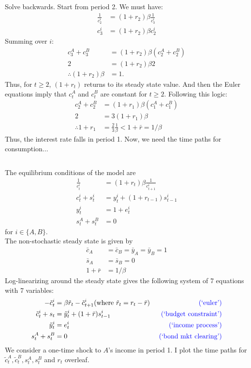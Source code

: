 \documentclass[12pt]{article}
\begin{document}
Solve backwards. Start from period 2. We must have:
\begin{align*}
\frac{1}{c^i_2} &= (1+r_2)\beta \frac{1}{c^i_{3}} \\
c^i_3 &= (1+r_2)\beta c^i_2
\end{align*}
Summing over $i$:
\begin{align*}
c^A_3 + c^B_3 &=(1+r_2)\beta (c^A_2+c^B_2)\\
2 &=(1+r_2)\beta 2\\
\therefore (1+r_2)\beta &= 1.
\end{align*}
Thus, for $t\geq 2$, $(1+r_t)$ returns to its steady state value. And then the Euler equations imply that $c^A_t$ and $c^B_t$ are constant for $t\geq 2$. Following this logic:
\begin{align*}
c^A_2 + c^B_2 &=(1+r_1)\beta (c^A_1+c^B_1)\\
2 &= 3(1+r_1)\beta\\
\therefore 1+r_1 &= \frac{2}{3} \frac{1}{\beta} < 1+ \bar r = 1/\beta
\end{align*}
Thus, the interest rate falls in period 1. Now, we need the time paths for consumption...



\subsection{}
The equilibrium conditions of the model are
\begin{align}
\frac{1}{c^i_t} &=(1+r_t)\beta \frac{1}{c^i_{t+1}}\\
c^i_t + s^i_t &= y^i_t + (1+r_{t-1})s^i_{t-1}\\
y_t^i &= 1 + e^i_t \\
s^A_t + s^B_t &=0
\end{align}
for $i \in \{A,B\}$.\\

The non-stochastic steady state is given by
\begin{align*}
\bar c_A &= \bar c_B = \bar y_A = \bar y_B =1\\
\bar s_A &= \bar s_B = 0\\
1+\bar r &= 1/\beta
\end{align*}
Log-linearizing around the steady state gives the following system of 7 equations with 7 variables:
\begin{align}
-\tilde c_t^i &= \beta \tilde r_t - \tilde c^i_{t+1} (\text{where } \tilde r_t = r_t - \bar r) &\textcolor{blue}{\text{ (`euler')}} \\
\tilde c_t^i + s_t &= \tilde y^i_t + (1+\bar r) s^i_{t-1} &\textcolor{blue}{\text{ (`budget constraint')}}\\
\tilde y^i_t &= e^i_t  &\textcolor{blue}{\text{ (`income process')}}\\
s^A_t + s^B_t &=0 &\textcolor{blue}{\text{ (`bond mkt clearing')}}
\end{align}
We consider a one-time shock to $A$'s income in period 1. I plot the time paths for $\tilde c^A_t,\tilde c^B_t, s^A_t, s^B_t$ and $r_t$ overleaf.
\end{document}
